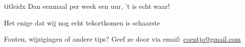 \documentclass[a4,openany,portrait,tikz]{article}
\begin{document}
\begin{songs}{titleidx}
			Dan eenmaal per week een uur, 't is echt waar!
		\endscripture	
	
		Het enige dat wij nog echt tekortkomen is schaarste 
		\endscripture	
		



	





%		
\end{songs}




%
%

Fouten, wijzigingen of andere tips? Geef ze door via email:   \href{mailto:coentjo@gmail.com}{coentjo@gmail.com} 
\end{document}
